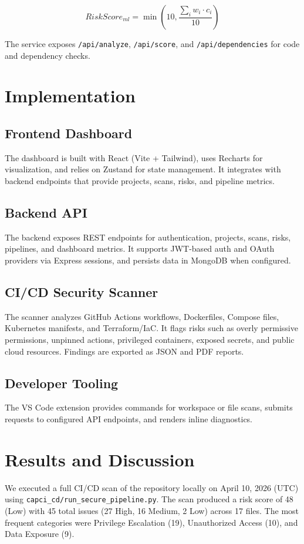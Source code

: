 \documentclass[conference]{IEEEtran}
\begin{document}
\begin{equation}
RiskScore_{ml} = \min\left(10, \frac{\sum_i w_i\cdot c_i}{10}\right)
\end{equation}

The service exposes \texttt{/api/analyze}, \texttt{/api/score}, and \texttt{/api/dependencies} for code and dependency checks.

\section{Implementation}

\subsection{Frontend Dashboard}
The dashboard is built with React (Vite + Tailwind), uses Recharts for visualization, and relies on Zustand for state management. It integrates with backend endpoints that provide projects, scans, risks, and pipeline metrics.

\subsection{Backend API}
The backend exposes REST endpoints for authentication, projects, scans, risks, pipelines, and dashboard metrics. It supports JWT-based auth and OAuth providers via Express sessions, and persists data in MongoDB when configured.

\subsection{CI/CD Security Scanner}
The scanner analyzes GitHub Actions workflows, Dockerfiles, Compose files, Kubernetes manifests, and Terraform/IaC. It flags risks such as overly permissive permissions, unpinned actions, privileged containers, exposed secrets, and public cloud resources. Findings are exported as JSON and PDF reports.

\subsection{Developer Tooling}
The VS Code extension provides commands for workspace or file scans, submits requests to configured API endpoints, and renders inline diagnostics.

\section{Results and Discussion}
We executed a full CI/CD scan of the repository locally on April 10, 2026 (UTC) using \texttt{capci\_cd/run\_secure\_pipeline.py}. The scan produced a risk score of 48 (Low) with 45 total issues (27 High, 16 Medium, 2 Low) across 17 files. The most frequent categories were Privilege Escalation (19), Unauthorized Access (10), and Data Exposure (9).
\end{document}
